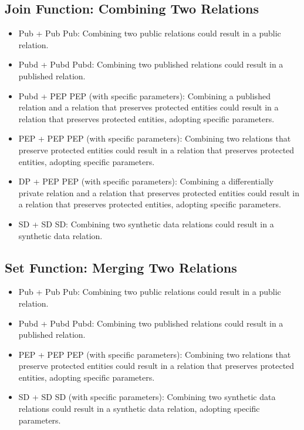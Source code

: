 \documentclass[letterpaper]{article} %
\begin{document}
\subsection{Join Function: Combining Two Relations}
\begin{itemize}
    \item Pub + Pub \textrightarrow{} Pub: Combining two public relations could result in a public relation.
    \item Pubd + Pubd \textrightarrow{} Pubd: Combining two published relations could result in a published relation.
    \item Pubd + PEP \textrightarrow{} PEP (with specific parameters): Combining a published relation and a relation that preserves protected entities could result in a relation that preserves protected entities, adopting specific parameters.
    \item PEP + PEP \textrightarrow{} PEP (with specific parameters): Combining two relations that preserve protected entities could result in a relation that preserves protected entities, adopting specific parameters.
    \item DP + PEP \textrightarrow{} PEP (with specific parameters): Combining a differentially private relation and a relation that preserves protected entities could result in a relation that preserves protected entities, adopting specific parameters.
    \item SD + SD \textrightarrow{} SD: Combining two synthetic data relations could result in a synthetic data relation.
\end{itemize}

\subsection{Set Function: Merging Two Relations}
\begin{itemize}
    \item Pub + Pub \textrightarrow{} Pub: Combining two public relations could result in a public relation.
    \item Pubd + Pubd \textrightarrow{} Pubd: Combining two published relations could result in a published relation.
    \item PEP + PEP \textrightarrow{} PEP (with specific parameters): Combining two relations that preserve protected entities could result in a relation that preserves protected entities, adopting specific parameters.
    \item SD + SD \textrightarrow{} SD (with specific parameters): Combining two synthetic data relations could result in a synthetic data relation, adopting specific parameters.
\end{itemize}
\end{document}
